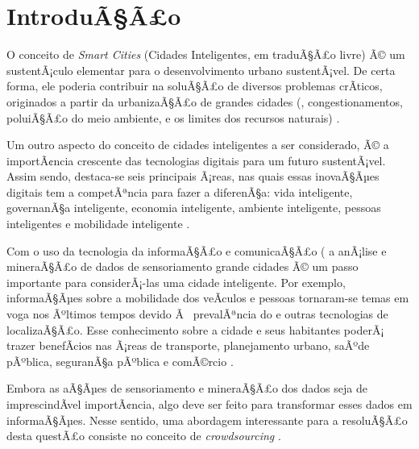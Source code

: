 \chapter{IntroduÃ§Ã£o}\label{cap:introducao}

O conceito de \textit{Smart Cities} (Cidades Inteligentes, em traduÃ§Ã£o livre) Ã© um sustentÃ¡culo elementar para o desenvolvimento urbano sustentÃ¡vel. De certa forma, ele poderia contribuir na soluÃ§Ã£o de diversos problemas crÃ­ticos, originados a partir da urbanizaÃ§Ã£o de grandes cidades (, congestionamentos, poluiÃ§Ã£o do meio ambiente, e os limites dos recursos naturais) \cite{pan2013}.

Um outro aspecto do conceito de cidades inteligentes a ser considerado, Ã© a importÃ¢ncia crescente das tecnologias digitais para um futuro sustentÃ¡vel. Assim sendo, destaca-se seis principais Ã¡reas, nas quais essas inovaÃ§Ãµes digitais tem a competÃªncia para fazer a diferenÃ§a: vida inteligente, governanÃ§a inteligente, economia inteligente, ambiente inteligente, pessoas inteligentes e mobilidade inteligente \cite{journals/jtaer/SchuurmanBMM12}.

Com o uso da tecnologia da informaÃ§Ã£o e comunicaÃ§Ã£o (   a  anÃ¡lise e mineraÃ§Ã£o de dados de sensoriamento  grande cidades Ã© um passo importante para considerÃ¡-las uma cidade inteligente. Por exemplo, informaÃ§Ãµes sobre a mobilidade dos veÃ­culos e pessoas tornaram-se temas em voga nos Ãºltimos tempos  devido Ã  prevalÃªncia do  e outras tecnologias de localizaÃ§Ã£o. Esse conhecimento sobre a cidade e seus habitantes poderÃ¡ trazer benefÃ­cios nas Ã¡reas de transporte, planejamento urbano, saÃºde pÃºblica, seguranÃ§a pÃºblica e comÃ©rcio \cite{pan2013}.

Embora as aÃ§Ãµes de sensoriamento e mineraÃ§Ã£o dos dados seja de imprescindÃ­vel importÃ¢ncia, algo deve ser feito para transformar esses dados em informaÃ§Ãµes. Nesse sentido, uma abordagem interessante para a resoluÃ§Ã£o desta questÃ£o consiste no conceito de \textit{crowdsourcing} \cite{shur}.

